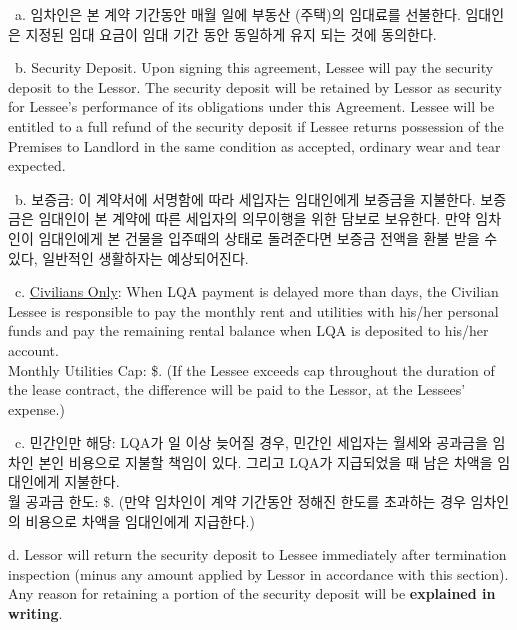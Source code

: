 \documentclass[10pt, letterpaper]{article}
\newcommand{\VPayDay}{}
\newcommand{\VLQADays}{}
\newcommand{\VUtilCap}{}
\newcommand{\ul}[1]{\underline{\makebox[#1]{}}}
\newcommand{\uf}[2]{\underline{\makebox[#1]{\smash{#2}}}}
\newcommand{\init}{\ul{1cm}\ }
\begin{document}
\init a. 임차인은 본 계약 기간동안 매월 \uf{1.2cm}{\VPayDay} 일에 부동산 (주택)의 임대료를 선불한다. 임대인은 지정된 임대 요금이 임대 기간 동안 동일하게 유지 되는 것에 동의한다.

\vspace{3pt}

\init b. Security Deposit. Upon signing this agreement, Lessee will pay the security deposit to the Lessor. The security deposit will be retained by Lessor as security for Lessee's performance of its obligations under this Agreement. Lessee will be entitled to a full refund of the security deposit if Lessee returns possession of the Premises to Landlord in the same condition as accepted, ordinary wear and tear expected.

\init b. 보증금: 이 계약서에 서명함에 따라 세입자는 임대인에게 보증금을 지불한다. 보증금은 임대인이 본 계약에 따른 세입자의 의무이행을 위한 담보로 보유한다. 만약 임차인이 임대인에게 본 건물을 입주때의 상태로 돌려준다면 보증금 전액을 환불 받을 수 있다, 일반적인 생활하자는 예상되어진다.

\vspace{3pt}

\init c. \uline{Civilians Only}: When LQA payment is delayed more than \uf{1cm}{\VLQADays} days, the Civilian Lessee is responsible to pay the monthly rent and utilities with his/her personal funds and pay the remaining rental balance when LQA is deposited to his/her account.\\
Monthly Utilities Cap: \$\uf{2cm}{\VUtilCap}. (If the Lessee exceeds cap throughout the duration of the lease contract, the difference will be paid to the Lessor, at the Lessees' expense.)

\init c. 민간인만 해당: LQA가 \uf{1cm}{} 일 이상 늦어질 경우, 민간인 세입자는 월세와 공과금을 임차인 본인 비용으로 지불할 책임이 있다. 그리고 LQA가 지급되었을 때 남은 차액을 임대인에게 지불한다.\\
월 공과금 한도: \$\uf{2cm}{}. (만약 임차인이 계약 기간동안 정해진 한도를 초과하는 경우 임차인의 비용으로 차액을 임대인에게 지급한다.)

\vspace{3pt}

\hspace{1.2cm} d. Lessor will return the security deposit to Lessee immediately after termination inspection (minus any amount applied by Lessor in accordance with this section). Any reason for retaining a portion of the security deposit will be \textbf{explained in writing}.
\end{document}
